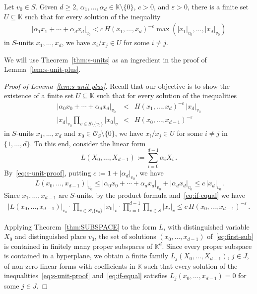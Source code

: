 \documentclass[a4paper,UKenglish,cleveref, autoref, thm-restate]{lipics-v2021}
\begin{document}
\begin{theorem}
 Let $v_0 \in S$.
  Given $d\geq 2$, $\alpha_1,\ldots,\alpha_d \in \mathbb K \setminus\{0\}$, $c>0$, and $\varepsilon>0$, there is a finite 
set  $U \subseteq \mathbb K$ such that for every solution of the inequality
\begin{gather*} | \alpha_1 x_1 + \cdots + \alpha_dx_d|_{v_0} < c\, H(x_1,\ldots,x_d)^{-\varepsilon} \max(|x_1|_{v_0},\ldots,|x_d|_{v_0}) 
\end{gather*}
in $S$-units $x_1,\ldots,x_d$, we have $x_i/x_j \in U$ for some $i\neq j$.
    \label{thm:s-units}
\end{theorem}

We will use Theorem~\ref{thm:s-units} as an ingredient in the proof of Lemma~\ref{lem:s-unit-plus}.
  
\begin{proof}[Proof of Lemma~\ref{lem:s-unit-plus}]
Recall that our objective is to show the existence of a finite set $U\subseteq \mathbb K$ such that 
for every solution of the inequalities
%
\begin{eqnarray}
\left|\alpha_0x_0+\cdots +\alpha_dx_d\right|_{v_0} &< & H(x_1,\ldots,x_d)^{-\varepsilon} \, |x_d|_{v_0}  \label{eq:s-unit-proof} \\
|x_d|_{v_0}  \prod_{v\in S\setminus \{v_0\}}|x_0|_v  & < & H(x_0,\ldots,x_{d-1})^{-\varepsilon}  \label{eq:if-equal}
\end{eqnarray}
in $S$-units $x_1,\ldots,x_d$ and $x_0 \in \mathcal O_S\setminus \{0\}$, we have $x_i/x_j\in U$ for some $i\neq j$ in $\{1,\ldots,d\}$.
To this end, consider the linear form \[ L(X_0,\ldots,X_{d-1}) := \sum_{i=0}^{d-1}\alpha_i X_i \, .\] By~\eqref{eq:s-unit-proof}, putting $c:=1+|\alpha_d|_{v_0}$, we have 
\[ |L(x_0,\ldots,x_{d-1})|_{v_0} \leq \left|\alpha_0x_0 +\cdots + \alpha_dx_d\right|_{v_0}  +\left| \alpha_d x_d \right|_{v_0} \leq c\, |x_d|_{v_0} \, .\] Since $x_1,\ldots,x_{d-1}$ are $S$-units, by the product formula and~\eqref{eq:if-equal} we have 
\begin{gather}
|L(x_0,\ldots,x_{d-1})|_{v_0} \cdot \prod_{v\in S \setminus \{v_0\}} |x_0|_v \cdot \prod_{i=1}^{d-1} \prod_{v\in S} |x_i|_v \leq c\, H(x_0,\ldots,x_{d-1})^{-\varepsilon}\, . 
\label{eq:first-sub}
\end{gather}

Applying Theorem~\ref{thm:SUBSPACE} to the form $L$, with distinguished variable $X_0$ and distinguished place $v_0$, the set of solutions $(x_0,\ldots,x_{d-1})$ of~\eqref{eq:first-sub} is contained in finitely many proper subspaces of $\mathbb K^d$.
Since every proper subspace is contained in a hyperplane,
we obtain a finite family $L_j(X_0,\ldots,X_{d-1})$, $j \in J$, of non-zero linear forms with coefficients in $\mathbb K$
such that every solution of the inequalities~\eqref{eq:s-unit-proof} and~\eqref{eq:if-equal} satisfies $L_j(x_0,\ldots,x_{d-1})=0$ for some $j \in J$.


\end{proof}
\end{document}

